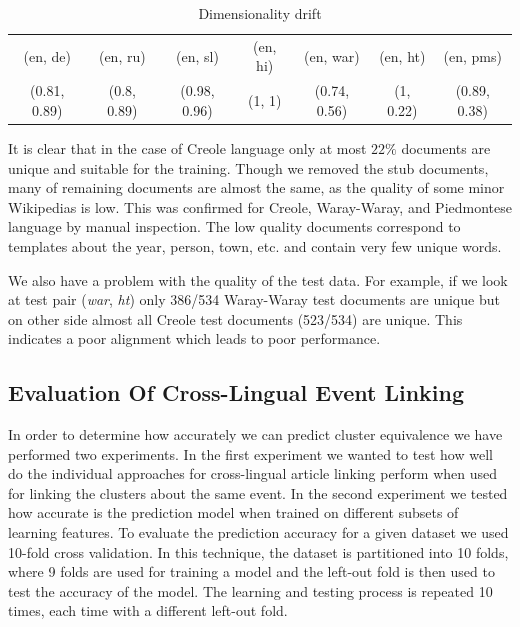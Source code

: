 \documentclass[twoside,11pt]{article}
\begin{document}
\begin{table}[h]
\caption{Dimensionality drift}
\label{table:rank}
\begin{tabular}{|c|c|c|c|c|c|c|}
\cline{1-7}
(en, de)     &   (en, ru)     &   (en, sl)       &     (en, hi)&   (en, war)      &      (en, ht) &   (en, pms)\\
\cline{1-7}
(0.81, 0.89)   &  (0.8, 0.89)  &   (0.98, 0.96)    &    (1, 1)  &   (0.74, 0.56)  &      (1, 0.22)  &   (0.89, 0.38)\\
\cline{1-7}
\end{tabular}
\end{table}

It is clear that in the case of Creole language only at most $22\%$ documents are unique and suitable for the training. Though we removed the stub documents, many of remaining documents are almost the same, as the quality of some minor Wikipedias is low. This was confirmed for Creole, Waray-Waray, and Piedmontese language by manual inspection. The low quality documents correspond to templates about the year, person, town, etc. and contain very few unique words.

We also have a problem with the quality of the test data. For example, if we look at test pair (\emph{war}, \emph{ht}) only 386/534 Waray-Waray test documents are unique but on other side almost all Creole test documents (523/534) are unique. This indicates a poor alignment which leads to poor performance.

\subsection{Evaluation Of Cross-Lingual Event Linking}

In order to determine how accurately we can predict cluster equivalence we have performed two experiments. In the first experiment we wanted to test how well do the individual approaches for cross-lingual article linking perform when used for linking the clusters about the same event. In the second experiment we tested how accurate is the prediction model when trained on different subsets of learning features. To evaluate the prediction accuracy for a given dataset we used 10-fold cross validation. In this technique, the dataset is partitioned into 10 folds, where 9 folds are used for training a model and the left-out fold is then used to test the accuracy of the model. The learning and testing process is repeated 10 times, each time with a different left-out fold.
\end{document}
